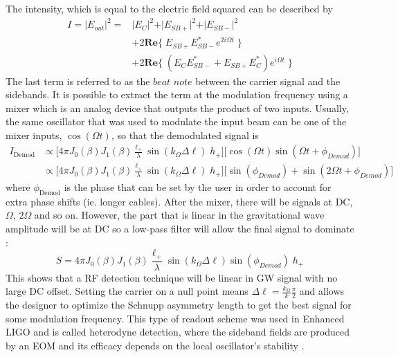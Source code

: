 		The	intensity, which is equal to the electric field squared can be described by
		\begin{equation}\label{RFdet}
		\begin{aligned}
			I	= \vert E_{out} \vert^2  =	&\vert E_{C}\vert^2 + \vert E_{SB+}\vert^2 + \vert E_{SB-}\vert^2 \\
										  	& + 2 \mathbf{Re} \{ \; E_{SB+} E^*_{SB-} e^{2i\Omega t} \; \}\\
										  	& + 2 \mathbf{Re} \{ \; (E_{C} E^*_{SB-} +  E_{SB+} E^*_{C} ) e^{i\Omega t} \; \}
		\end{aligned}
		\end{equation}
		The last term is referred to as the $beat$ $note$ between the carrier signal and the sidebands.  It is possible to extract the term at the modulation frequency using a mixer which is an analog device that outputs the product of two inputs. Usually, the same oscillator that was used to modulate the input beam can be one of the mixer inputs, $\cos(\Omega t)$,  so that the demodulated signal is
		\begin{equation}
		\begin{aligned}
		I_{\text{Demod}} 	&\propto \big[ 4 \pi  J_0(\beta) J_1(\beta) \frac{\ell_+}{\lambda}  \sin(k_{\Omega} \Delta \ell)  \; h_{+}\big] \big[ \cos(\Omega t)  \sin(\Omega t + \phi_{Demod}) \big] \\
					&\propto \big[ 4 \pi  J_0(\beta) J_1(\beta) \frac{\ell_+}{\lambda}  \sin(k_{\Omega} \Delta \ell)  \; h_{+}\big] \big[ \sin(\phi_{Demod}) + \sin(2\Omega t + \phi_{Demod}) \big]
		\end{aligned}
		\end{equation}
		where $\phi_{\text{Demod}}$ is the phase that can be set by the user in order to account for extra phase shifts (ie. longer cables). After the mixer, there will be signals at DC, $\Omega$, $2\Omega$ and so on. However, the part that is linear in the gravitational wave amplitude will be at DC so a low-pass filter will allow the final signal to dominate \cite{BlackPDH}:
		\begin{equation}\label{eq:SM_hetero}
		S = 4 \pi  J_0(\beta) J_1(\beta) \frac{\ell_+}{\lambda}  \sin(k_{\Omega} \Delta \ell) \sin(\phi_{Demod}) \; h_{+}
		\end{equation}
		This shows that a RF detection technique will be linear in GW signal with no large DC offset. Setting the carrier on a null point means $\Delta \ell = \frac{k_{\Omega}}{k} \frac{\pi}{2}$ and allows the designer to optimize the Schnupp asymmetry length to get the best signal for some modulation frequency. This type of readout scheme was used in Enhanced LIGO and is called heterodyne detection, where the sideband fields are produced by an EOM and its efficacy depends on the local oscillator's stability \cite{FritschelReadout}.  
